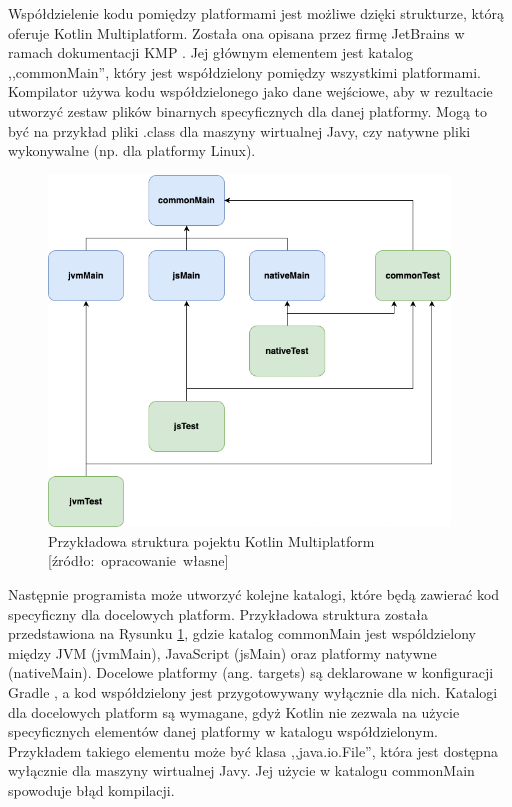 Współdzielenie kodu pomiędzy platformami jest możliwe dzięki strukturze, którą oferuje Kotlin Multiplatform.
Została ona opisana przez firmę JetBrains w ramach dokumentacji KMP \cite{kotlinMultiplatformDev}.
Jej głównym elementem jest katalog ,,commonMain'', który jest współdzielony pomiędzy wszystkimi platformami.
Kompilator używa kodu współdzielonego jako dane wejściowe, aby w rezultacie utworzyć zestaw plików binarnych specyficznych dla danej platformy.
Mogą to być na przykład pliki .class dla maszyny wirtualnej Javy, czy natywne pliki wykonywalne (np. dla platformy Linux).

\begin{figure}[h]
    \centering
    \includegraphics[width=0.95\textwidth]{charts/kmp-structure.drawio.png}
    \caption{Przykładowa struktura pojektu Kotlin Multiplatform [źródło:~opracowanie~własne]}
    \label{fig:kmp_project_structure}
\end{figure}

Następnie programista może utworzyć kolejne katalogi, które będą zawierać kod specyficzny dla docelowych platform.
Przykładowa struktura została przedstawiona na Rysunku \ref{fig:kmp_project_structure}, gdzie katalog commonMain jest wspóldzielony między JVM (jvmMain), JavaScript (jsMain) oraz platformy natywne (nativeMain).
Docelowe platformy (ang. targets) są deklarowane w konfiguracji Gradle \cite{kotlinMultiplatformDev}, a kod współdzielony jest przygotowywany wyłącznie dla nich.
Katalogi dla docelowych platform są wymagane, gdyż Kotlin nie zezwala na użycie specyficznych elementów danej platformy w katalogu współdzielonym.
Przykładem takiego elementu może być klasa ,,java.io.File'', która jest dostępna wyłącznie dla maszyny wirtualnej Javy.
Jej użycie w katalogu commonMain spowoduje błąd kompilacji.

